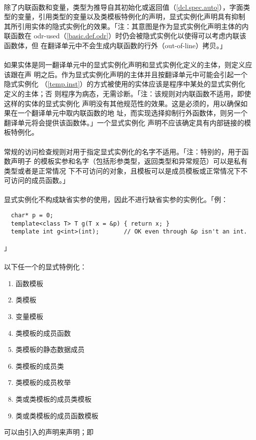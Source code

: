 \paragraph{}
除了内联函数和变量，类型为推导自其初始化或返回值（\ref{dcl.spec.auto}），字面类
型的变量，引用类型的变量以及类模板特例化的声明，显式实例化声明具有抑制
其所引用实体的隐式实例化的效果。「注：其意图是作为显式实例化声明主体的内联函数在
odr-used（\ref{basic.def.odr}）时仍会被隐式实例化以使得可以考虑内联该函数体，但
在翻译单元中不会生成内联函数的行外（out-of-line）拷贝。」

\paragraph{}
如果实体是同一翻译单元中的显式实例化声明和显式实例化定义的主体，则定义应该跟在声
明之后。作为显式实例化声明的主体并且按翻译单元中可能会引起一个隐式实例化
（\ref{temp.inst}）的方式被使用的实体应该是程序中某处的显式实例化定义的主体；否
则程序为病态，无需诊断。「注：该规则对内联函数不适用，即使这样的实体的显式实例化
声明没有其他规范性的效果。这是必须的，用以确保如果在一个翻译单元中取内联函数的地
址，而实现选择抑制行外函数体，则另一个翻译单元将会提供该函数体。」一个显式实例化
声明不应该确定具有内部链接的模板特例化。

\paragraph{}
常规的访问检查规则对用于指定显式实例化的名字不适用。「注：特别的，用于函数声明子
的模板实参和名字（包括形参类型，返回类型和异常规范）可以是私有类型或者是正常情况
下不可访问的对象，且模板可以是成员模板或正常情况下不可访问的成员函数。」

\paragraph{}
显式实例化不构成缺省实参的使用，因此不进行缺省实参的实例化。「例：
\begin{lstlisting}
  char* p = 0;
  template<class T> T g(T x = &p) { return x; }
  template int g<int>(int);       // OK even through &p isn't an int.
\end{lstlisting}」

\paragraph{}
以下任一个的显式特例化：
\begin{enumerate}
  \item{函数模板}
  \item{类模板}
  \item{变量模板}
  \item{类模板的成员函数}
  \item{类模板的静态数据成员}
  \item{类模板的成员类}
  \item{类模板的成员枚举}
  \item{类或类模板的成员类模板}
  \item{类或类模板的成员函数模板}
\end{enumerate}
可以由引入的声明来声明；即

